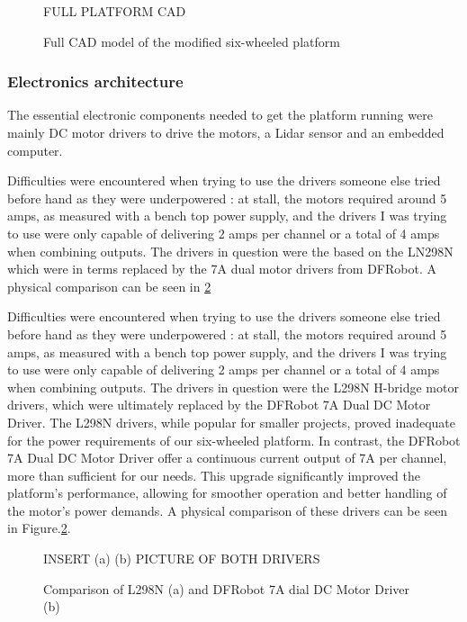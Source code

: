 \documentclass[11pt]{article}
\begin{document}
            \begin{figure}[htbp]
                \centering
                FULL PLATFORM CAD
                \caption{Full CAD model of the modified six-wheeled platform}
                \label{fig:full_cad_model}
            \end{figure}

            \subsubsection{Electronics architecture}
                The essential electronic components needed to get the platform running were mainly DC motor drivers to drive the motors, a Lidar sensor and an embedded computer.
                
                Difficulties were encountered when trying to use the drivers someone else tried before hand as they were underpowered : at stall, the motors required around 5 amps, as measured with a bench top power supply, and the drivers I was trying to use were only capable of delivering 2 amps per channel or a total of 4 amps when combining outputs. The drivers in question were the based on the LN298N which were in terms replaced by the 7A dual motor drivers from DFRobot. A physical comparison can be seen in \ref{fig:drivers_comparison}
                
                Difficulties were encountered when trying to use the drivers someone else tried before hand as they were underpowered : at stall, the motors required around 5 amps, as measured with a bench top power supply, and the drivers I was trying to use were only capable of delivering 2 amps per channel or a total of 4 amps when combining outputs. The drivers in question were the L298N H-bridge motor drivers, which were ultimately replaced by the DFRobot 7A Dual DC Motor Driver. The L298N drivers, while popular for smaller projects, proved inadequate for the power requirements of our six-wheeled platform. In contrast, the DFRobot 7A Dual DC Motor Driver offer a continuous current output of 7A per channel, more than sufficient for our needs. This upgrade significantly improved the platform's performance, allowing for smoother operation and better handling of the motor's power demands. A physical comparison of these drivers can be seen in Figure.\ref{fig:drivers_comparison}.

                
                \begin{figure}[h]
                    \centering
                    INSERT (a) (b) PICTURE OF BOTH DRIVERS
                    \caption{Comparison of L298N (a) and DFRobot 7A dial DC Motor Driver (b)}
                    \label{fig:drivers_comparison}
                \end{figure}
\end{document}
